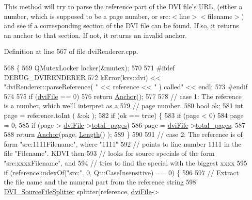 This method will try to parse the reference part of the D\+V\+I file's U\+R\+L, (either a number, which is supposed to be a page number, or src\+:$<$line$>$$<$filename$>$) and see if a corresponding section of the D\+V\+I file can be found. If so, it returns an anchor to that section. If not, it returns an invalid anchor. 

Definition at line 567 of file dvi\+Renderer.\+cpp.


\begin{DoxyCode}
568 \{
569   QMutexLocker locker(&mutex);
570 
571 \textcolor{preprocessor}{#ifdef DEBUG\_DVIRENDERER}
572   kError(kvs::dvi) << \textcolor{stringliteral}{"dviRenderer::parseReference( "} << reference << \textcolor{stringliteral}{" ) called"} << endl;
573 \textcolor{preprocessor}{#endif}
574 
575   \textcolor{keywordflow}{if} (\hyperlink{classdviRenderer_a67ded13a1a8da343aa0ee921ed96d4c2}{dviFile} == 0)
576     \textcolor{keywordflow}{return} \hyperlink{classAnchor}{Anchor}();
577 
578   \textcolor{comment}{// case 1: The reference is a number, which we'll interpret as a}
579   \textcolor{comment}{// page number.}
580   \textcolor{keywordtype}{bool} ok;
581   \textcolor{keywordtype}{int} page = reference.toInt ( &ok );
582   \textcolor{keywordflow}{if} (ok == \textcolor{keyword}{true}) \{
583     \textcolor{keywordflow}{if} (page < 0)
584       page = 0;
585     \textcolor{keywordflow}{if} (page > \hyperlink{classdviRenderer_a67ded13a1a8da343aa0ee921ed96d4c2}{dviFile}->\hyperlink{classdvifile_a71577dbd82a462b855abc96be3b369c5}{total\_pages})
586       page = \hyperlink{classdviRenderer_a67ded13a1a8da343aa0ee921ed96d4c2}{dviFile}->\hyperlink{classdvifile_a71577dbd82a462b855abc96be3b369c5}{total\_pages};
587 
588     \textcolor{keywordflow}{return} \hyperlink{classAnchor}{Anchor}(page, \hyperlink{classLength}{Length}() );
589   \}
590 
591   \textcolor{comment}{// case 2: The reference is of form "src:1111Filename", where "1111"}
592   \textcolor{comment}{// points to line number 1111 in the file "Filename". KDVI then}
593   \textcolor{comment}{// looks for source specials of the form "src:xxxxFilename", and}
594   \textcolor{comment}{// tries to find the special with the biggest xxxx}
595   \textcolor{keywordflow}{if} (reference.indexOf(\textcolor{stringliteral}{"src:"}, 0, Qt::CaseInsensitive) == 0) \{
596 
597     \textcolor{comment}{// Extract the file name and the numeral part from the reference string}
598     \hyperlink{classDVI__SourceFileSplitter}{DVI\_SourceFileSplitter} splitter(reference, \hyperlink{classdviRenderer_a67ded13a1a8da343aa0ee921ed96d4c2}{dviFile}->

\end{DoxyCode}
